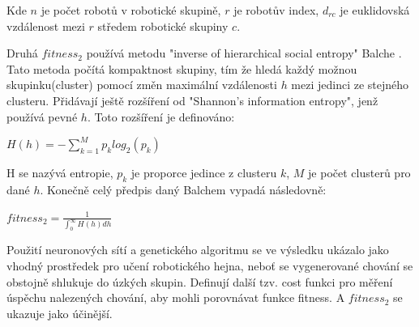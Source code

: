 \par 
Kde $n$ je počet robotů v robotické skupině, $r$ je robotův index, $d_{rc}$ je euklidovská vzdálenost mezi $r$ středem robotické skupiny $c$. 
\par
Druhá $fitness_2$ používá metodu "inverse of hierarchical social entropy" Balche \citep{balch2000hierarchic}. Tato metoda počítá kompaktnost skupiny, tím že hledá každý možnou skupinku(cluster) pomocí změn maximální vzdálenosti $h$ mezi jedinci ze stejného clusteru. Přidávají ještě rozšíření od "Shannon's information entropy", jenž používá pevné $h$. Toto rozšíření je definováno: 
\par 
\begin{center}
\textbf{$H(h)=-\sum\limits_{k=1}^{M} p_k log_2(p_k)$}
\end{center}
\par 
H se nazývá entropie, $p_k$ je proporce jedince z clusteru $k$, $M$ je počet clusterů pro dané $h$. Konečně celý předpis daný Balchem vypadá následovně: 
\par
\begin{center}
\textbf{$fitness_2 = \frac{1}{\int_{0}^{\infty}H(h)dh}$}
\end{center}
\par 
Použití neuronových sítí a genetického algoritmu se ve výsledku ukázalo jako vhodný prostředek pro učení robotického hejna, neboť se vygenerované chování se obstojně shlukuje do úzkých skupin. Definují další tzv. cost funkci pro měření úspěchu nalezených chování, aby mohli porovnávat funkce fitness. A $fitness_2$ se ukazuje jako účinější. 
